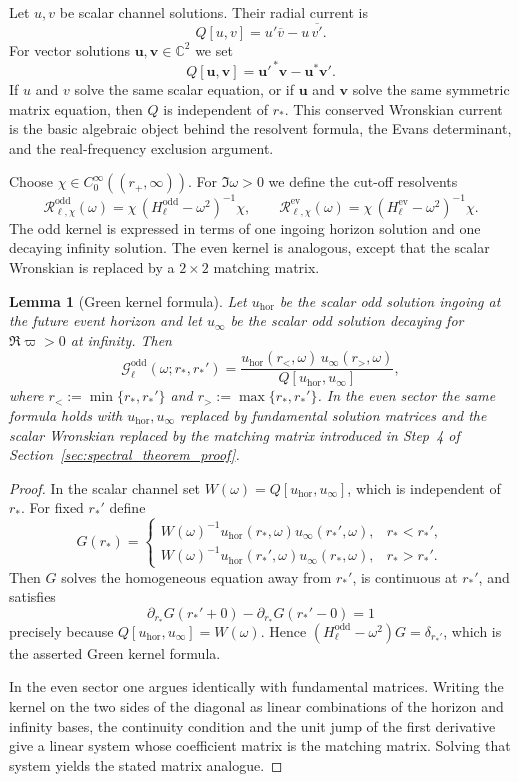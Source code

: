 \documentclass[12pt]{article}
\numberwithin{equation}{section}
\theoremstyle{plain}
\newtheorem{lemma}[theorem]{Lemma}
\theoremstyle{definition}
\theoremstyle{remark}
\newcommand{\C}{\mathbb C}
\newcommand{\hor}{\mathrm{hor}}
\newcommand{\cG}{\mathcal G}
\newcommand{\cR}{\mathcal R}
\newcommand{\om}{\omega}
\newcommand{\vp}{\varpi}
\begin{document}
Let $u,v$ be scalar channel solutions.  Their radial current is
\[
   Q[u,v]=u'\overline v-u\,\overline{v'}.
\]
For vector solutions $\bm u,\bm v\in\C^2$ we set
\[
   Q[\bm u,\bm v]=\bm u'^{\,*}\bm v-\bm u^{*}\bm v'.
\]
If $u$ and $v$ solve the same scalar equation, or if $\bm u$ and $\bm v$ solve the same symmetric matrix equation, then $Q$ is independent of $r_*$.  This conserved Wronskian current is the basic algebraic object behind the resolvent formula, the Evans determinant, and the real-frequency exclusion argument.

Choose $\chi\in C_0^\infty((r_+,\infty))$.  For $\Im\om>0$ we define the cut-off resolvents
\[
   \cR_{\ell,\chi}^{\mathrm{odd}}(\om)=\chi\,(H_{\ell}^{\mathrm{odd}}-\om^2)^{-1}\chi,
   \qquad
   \cR_{\ell,\chi}^{\mathrm{ev}}(\om)=\chi\,(H_{\ell}^{\mathrm{ev}}-\om^2)^{-1}\chi.
\]
The odd kernel is expressed in terms of one ingoing horizon solution and one decaying infinity solution.  The even kernel is analogous, except that the scalar Wronskian is replaced by a $2\times2$ matching matrix.

\begin{lemma}[Green kernel formula]\label{lem:green_kernel_formula}
Let $u_{\hor}$ be the scalar odd solution ingoing at the future event horizon and let $u_{\infty}$ be the scalar odd solution decaying for $\Re\vp>0$ at infinity.  Then
\[
   \cG_{\ell}^{\mathrm{odd}}(\om;r_*,r_*')
   =
   \frac{u_{\hor}(r_<,\om)\,u_{\infty}(r_>,\om)}{Q[u_{\hor},u_{\infty}]},
\]
where $r_<:=\min\{r_*,r_*'\}$ and $r_>:=\max\{r_*,r_*'\}$.  In the even sector the same formula holds with $u_{\hor},u_{\infty}$ replaced by fundamental solution matrices and the scalar Wronskian replaced by the matching matrix introduced in Step~4 of Section~\ref{sec:spectral_theorem_proof}.
\end{lemma}

\begin{proof}
In the scalar channel set $W(\om)=Q[u_{\hor},u_{\infty}]$, which is independent of $r_*$.  For fixed $r_*'$ define
\[
   G(r_*)=
   \begin{cases}
      W(\om)^{-1}u_{\hor}(r_*,\om)u_{\infty}(r_*',\om), & r_*<r_*',\\[0.4ex]
      W(\om)^{-1}u_{\hor}(r_*',\om)u_{\infty}(r_*,\om), & r_*>r_*'.
   \end{cases}
\]
Then $G$ solves the homogeneous equation away from $r_*'$, is continuous at $r_*'$, and satisfies
\[
   \partial_{r_*}G(r_*'+0)-\partial_{r_*}G(r_*'-0)=1
\]
precisely because $Q[u_{\hor},u_{\infty}]=W(\om)$.  Hence $(H_{\ell}^{\mathrm{odd}}-\om^2)G=\delta_{r_*'}$, which is the asserted Green kernel formula.

In the even sector one argues identically with fundamental matrices.  Writing the kernel on the two sides of the diagonal as linear combinations of the horizon and infinity bases, the continuity condition and the unit jump of the first derivative give a linear system whose coefficient matrix is the matching matrix.  Solving that system yields the stated matrix analogue.
\end{proof}
\end{document}
